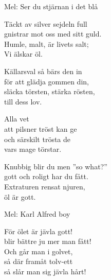 \begin{SongText}[Vi älskar öl]
    \begin{SongInfo}
        Mel: Ser du stjärnan i det blå
    \end{SongInfo}
    \begin{SongVerse}
        Täckt av silver sejdeln full\\%
        gnistrar mot oss med sitt guld.\\%
        Humle, malt, är livets salt;\\%
        Vi älskar öl.
    \end{SongVerse}
    \begin{SongVerse}
        Källarsval så bärs den in\\%
        för att glädja gommen din,\\%
        släcka törsten, stärka rösten,\\%
        till dess lov.
    \end{SongVerse}
    \begin{SongVerse}
        Alla vet\\%
        att pilsner tröst kan ge\\%
        och särskilt trösta de\\%
        vars mage törstar.
    \end{SongVerse}
    \begin{SongVerse}
        Knubbig blir du men ”so what?”\\%
        gott och roligt har du fått.\\%
        Extraturen rensat njuren,\\%
        öl är gott.
    \end{SongVerse}
\end{SongText}
\begin{SongText}
    \begin{SongInfo}
        Mel: Karl Alfred boy
    \end{SongInfo}
    \begin{SongVerse}
        För ölet är jävla gott!\\%
        blir bättre ju mer man fått!\\%
        Och går man i golvet,\\%
        så där framåt tolv-ett\\%
        så slår man sig jävla hårt!
    \end{SongVerse}
\end{SongText}
